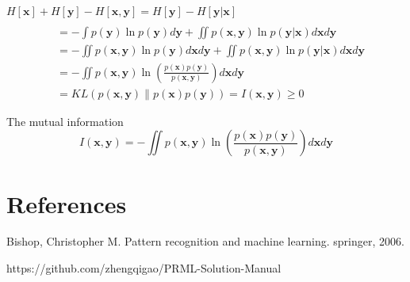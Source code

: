 \documentclass[5p,sort&compress]{elsarticle}
\begin{document}
$H[\mathbf{x}]+H[\mathbf{y}] -H[\mathbf{x}, \mathbf{y}]=H[\mathbf{y}]-H[\mathbf{y} | \mathbf{x}]$
\begin{equation}
\begin{aligned} \\ &=-\int p(\mathbf{y}) \ln p(\mathbf{y}) d \mathbf{y}+\iint p(\mathbf{x}, \mathbf{y}) \ln p(\mathbf{y} | \mathbf{x}) d \mathbf{x} d \mathbf{y} \\ &=-\iint p(\mathbf{x}, \mathbf{y}) \ln p(\mathbf{y}) d \mathbf{x} d \mathbf{y}+\iint p(\mathbf{x}, \mathbf{y}) \ln p(\mathbf{y} | \mathbf{x}) d \mathbf{x} d \mathbf{y} \\ &=-\iint p(\mathbf{x}, \mathbf{y}) \ln \left(\frac{p(\mathbf{x}) p(\mathbf{y})}{p(\mathbf{x}, \mathbf{y})}\right) d \mathbf{x} d \mathbf{y} \\ &=K L(p(\mathbf{x}, \mathbf{y}) \| p(\mathbf{x}) p(\mathbf{y}))=I(\mathbf{x}, \mathbf{y}) \geq 0 \end{aligned}
\end{equation}

The mutual information
\begin{equation}
I(\mathbf{x}, \mathbf{y})=-\iint p(\mathbf{x}, \mathbf{y}) \ln \left(\frac{p(\mathbf{x}) p(\mathbf{y})}{p(\mathbf{x}, \mathbf{y})}\right) d \mathbf{x} d \mathbf{y}
\end{equation}

\section*{References}


\begin{thebibliography}{9}

Bishop, Christopher M. Pattern recognition and machine learning. springer, 2006.

https://github.com/zhengqigao/PRML-Solution-Manual


\end{thebibliography}
\end{document}
